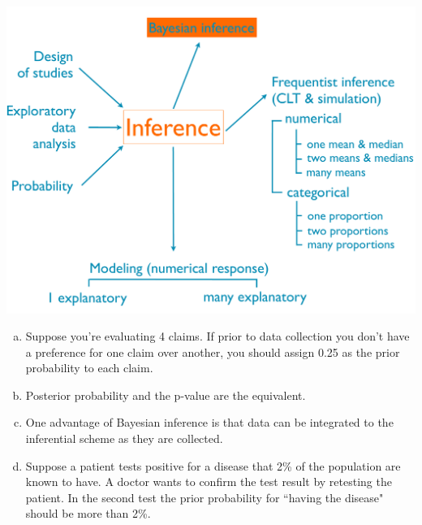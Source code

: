 \documentclass[slidestop,compress,mathserif,12pt,t,professionalfonts,xcolor=table]{beamer}
\newcommand{\solnMult}[1]{#1}
\newcommand{\soln}[1]{}
\begin{document}

\begin{frame}

{
{\scriptsize
{}}}
{
 \includegraphics[width=\textwidth]{figures/map/bayes}
}

\begin{enumerate}[(a)]
\item Suppose you're evaluating 4 claims. If prior to data collection you don't have a preference for one claim over another, you should assign 0.25 as the prior probability to each claim.
\item \solnMult{Posterior probability and the p-value are the equivalent.}
\item One advantage of Bayesian inference is that data can be integrated to the inferential scheme as they are collected.
\item Suppose a patient tests positive for a disease that 2\% of the population are known to have. A doctor wants to confirm the test result by retesting the patient. In the second test the prior probability for ``having the disease" should be more than 2\%.
\end{enumerate}

\pause
\soln{\red{Posterior = P(hypothesis $|$ data), p-value $\approx$ P(data $|$ hypothesis)}}

\end{frame}

\end{document}
